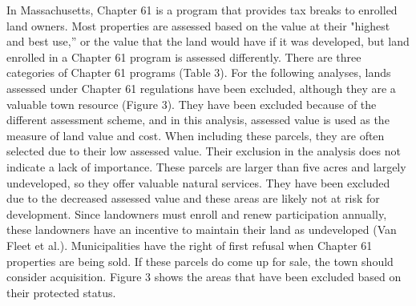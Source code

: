 \documentclass[12pt, stu, floatsintext,table]{apa7}
\begin{document}
\begin{table}[htbp]
\centering
  \caption{Types of land protection and examples in Franklin, MA. Most land is categorized as protected in perpetuity. This is land that is legally protected and often owned by the municipality or state. Land protected in a limited status is legally protected, but not in perpetuity.}
\end{table}
In Massachusetts, Chapter 61 is a program that provides tax breaks to enrolled land owners. Most properties are assessed based on the value at their "highest and best use,” or the value that the land would have if it was developed, but land enrolled in a Chapter 61 program is assessed differently. There are three categories of Chapter 61 programs (Table 3). For the following analyses, lands assessed under Chapter 61 regulations have been excluded, although they are a valuable town resource (Figure 3). They have been excluded because of the different assessment scheme, and in this analysis, assessed value is used as the measure of land value and cost. When including these parcels, they are often selected due to their low assessed value. Their exclusion in the analysis does not indicate a lack of importance. These parcels are larger than five acres and largely undeveloped, so they offer valuable natural services. They have been excluded due to the decreased assessed value and these areas are likely not at risk for development. Since landowners must enroll and renew participation annually, these landowners have an incentive to maintain their land as undeveloped (Van Fleet et al.). Municipalities have the right of first refusal when Chapter 61 properties are being sold. If these parcels do come up for sale, the town should consider acquisition. Figure 3 shows the areas that have been excluded based on their protected status. 
\end{document}
